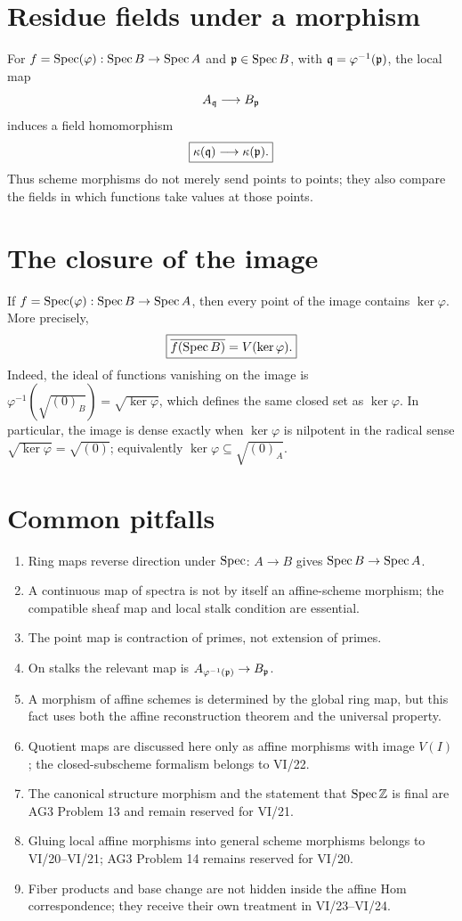 

\section{Residue fields under a morphism}

For $f=\operatorname{Spec}(\varphi):\operatorname{Spec} B\to\operatorname{Spec} A$ and $\mathfrak p\in\operatorname{Spec} B$, with
$\mathfrak q=\varphi^{-1}(\mathfrak p)$, the local map
\[
A_{\mathfrak q}\longrightarrow B_{\mathfrak p}
\]
induces a field homomorphism
\[
\boxed{\kappa(\mathfrak q)\longrightarrow\kappa(\mathfrak p).}
\]
Thus scheme morphisms do not merely send points to points; they also compare the fields in
which functions take values at those points.

\section{The closure of the image}

If $f=\operatorname{Spec}(\varphi):\operatorname{Spec} B\to\operatorname{Spec} A$, then every point of the image contains
$\ker\varphi$.  More precisely,
\[
\boxed{\overline{f(\operatorname{Spec} B)}=V(\ker\varphi).}
\]
Indeed, the ideal of functions vanishing on the image is
$\varphi^{-1}(\sqrt{(0)_B})=\sqrt{\ker\varphi}$, which defines the same closed set as
$\ker\varphi$.  In particular, the image is dense exactly when $\ker\varphi$ is nilpotent
in the radical sense $\sqrt{\ker\varphi}=\sqrt{(0)}$; equivalently
$\ker\varphi\subseteq\sqrt{(0)_A}$.

\section{Common pitfalls}
\begin{enumerate}
\item Ring maps reverse direction under $\operatorname{Spec}$: $A\to B$ gives $\operatorname{Spec} B\to\operatorname{Spec} A$.
\item A continuous map of spectra is not by itself an affine-scheme morphism; the compatible
sheaf map and local stalk condition are essential.
\item The point map is contraction of primes, not extension of primes.
\item On stalks the relevant map is $A_{\varphi^{-1}(\mathfrak p)}\to B_{\mathfrak p}$.
\item A morphism of affine schemes is determined by the global ring map, but this fact uses
both the affine reconstruction theorem and the universal property.
\item Quotient maps are discussed here only as affine morphisms with image $V(I)$; the
closed-subscheme formalism belongs to VI/22.
\item The canonical structure morphism and the statement that $\operatorname{Spec}\mathbb Z$ is final are
AG3 Problem 13 and remain reserved for VI/21.
\item Gluing local affine morphisms into general scheme morphisms belongs to VI/20--VI/21;
AG3 Problem 14 remains reserved for VI/20.
\item Fiber products and base change are not hidden inside the affine Hom correspondence;
they receive their own treatment in VI/23--VI/24.
\end{enumerate}

